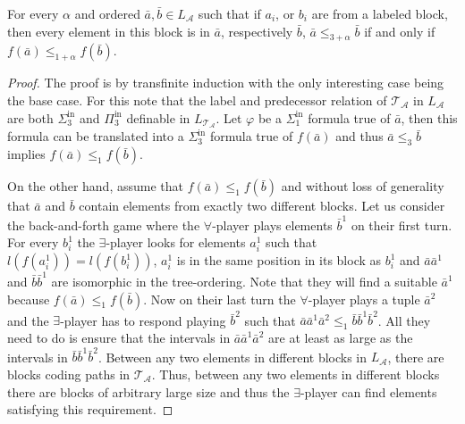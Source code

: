 \documentclass[10pt,a4paper]{amsart}
\renewcommand{\phi}{\varphi}
\providecommand{\A}{\mathcal{A}}
\providecommand{\Pinf}[1]{\Pi^{\mathrm{in}}_{#1}}
\providecommand{\Sinf}[1]{\Sigma^{\mathrm{in}}_{#1}}
\providecommand{\ba}{\bar a}
\providecommand{\bb}{\bar b}
\newcommand{\T}{{\mathcal{T}}}
\begin{document}
\begin{lemma}\label{lem:bf_treetolo}
   For every $\alpha$ and ordered $\ba,\bb\in L_\A$ such that if $a_i$, or $b_i$ are from a labeled
   block, then every element in this block is in $\ba$, respectively $\bb$, $\ba\leq_{3+\alpha}\bb$ if
   and only if $f(\ba)\leq_{1+\alpha} f(\bb)$.
\end{lemma}

\begin{proof}
   The proof is by transfinite induction with the only interesting case being
   the base case. For this note that the label and predecessor
   relation of $\T_\A$ in $L_{\A}$ are both $\Sinf{3}$ and $\Pinf{3}$
   definable in $L_{\T_\A}$. Let $\phi$ be a $\Sinf{1}$ formula true of
   $\ba$, then this formula can be translated into a $\Sinf{3}$ formula true
   of $f(\ba)$ and thus $\ba\leq_3 \bb$ implies $f(\ba)\leq_1 f(\bb)$. 

   On the other hand, assume that $f(\ba)\leq_1 f(\bb)$ and without loss of
   generality that $\ba$ and $\bb$ contain elements from exactly two
   different blocks. Let us consider the back-and-forth game where the
   $\forall$-player plays elements $\bb^1$ on their first turn. For every
   $b^1_i$ the $\exists$-player looks for elements $a^1_i$ such that
   $l(f(a^1_i))=l(f(b^1_i))$, $a^1_i$ is in the same position in its block as
   $b^1_i$ and $\ba\ba^1$ and $\bb\bb^1$ are
   isomorphic in the tree-ordering. Note that they will find a suitable $\ba^1$
   because $f(\ba)\leq_1 f(\bb)$. Now on their last turn the $\forall$-player
   plays a tuple $\ba^2$ and the $\exists$-player has to respond playing
   $\bb^2$ such that $\ba\ba^1\ba^2\leq_1 \bb\bb^1\bb^2$. All they need to do
   is ensure that the intervals in $\ba\ba^1\ba^2$ are at least as large as the
   intervals in $\bb\bb^1\bb^2$. Between any two elements in different blocks in
   $L_\A$, there are blocks coding paths in $\T_\A$. Thus, between any two
   elements in different blocks there are blocks of arbitrary large size and
   thus the $\exists$-player can find elements satisfying this requirement.
\end{proof}
\end{document}
